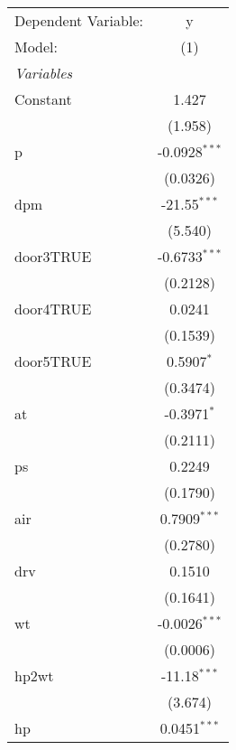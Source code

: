
\begingroup
\centering
\begin{tabular}{lc}
   \tabularnewline \midrule \midrule
   Dependent Variable:            & y\\  
   Model:                         & (1)\\  
   \midrule
   \emph{Variables}\\
   Constant                       & 1.427\\   
                                  & (1.958)\\   
   p                              & -0.0928$^{***}$\\   
                                  & (0.0326)\\   
   dpm                            & -21.55$^{***}$\\   
                                  & (5.540)\\   
   door3TRUE                      & -0.6733$^{***}$\\   
                                  & (0.2128)\\   
   door4TRUE                      & 0.0241\\   
                                  & (0.1539)\\   
   door5TRUE                      & 0.5907$^{*}$\\   
                                  & (0.3474)\\   
   at                             & -0.3971$^{*}$\\   
                                  & (0.2111)\\   
   ps                             & 0.2249\\   
                                  & (0.1790)\\   
   air                            & 0.7909$^{***}$\\   
                                  & (0.2780)\\   
   drv                            & 0.1510\\   
                                  & (0.1641)\\   
   wt                             & -0.0026$^{***}$\\   
                                  & (0.0006)\\   
   hp2wt                          & -11.18$^{***}$\\   
                                  & (3.674)\\   
   hp                             & 0.0451$^{***}$\\   

\end{tabular}
